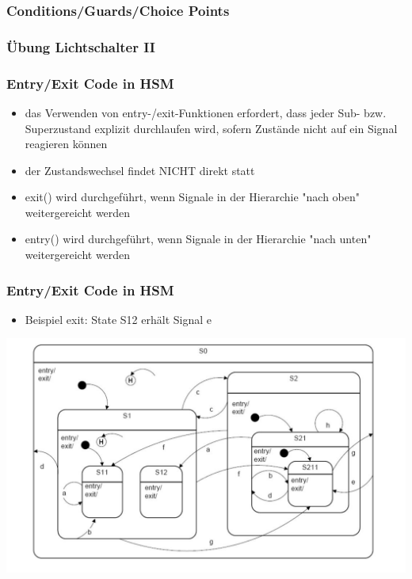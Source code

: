 \documentclass{beamer}
\begin{document}
\begin{frame}
 \frametitle{Conditions/Guards/Choice Points}
\end{frame}

\begin{frame}
 \frametitle{\"Ubung Lichtschalter II}
\end{frame}

\begin{frame}
	\frametitle{Entry/Exit Code in HSM }
	\begin{itemize}
		\item das Verwenden von entry-/exit-Funktionen erfordert, dass jeder Sub- bzw. Superzustand explizit durchlaufen wird, sofern Zust\"ande nicht auf ein Signal reagieren k\"onnen
		\item der Zustandswechsel findet NICHT direkt statt
		\item exit() wird durchgef\"uhrt, wenn Signale in der Hierarchie "nach oben" weitergereicht werden 
		\item entry() wird  durchgef\"uhrt, wenn Signale in der Hierarchie "nach unten" weitergereicht werden
	\end{itemize}
\end{frame}

\begin{frame}
	\frametitle{Entry/Exit Code in HSM }
	\begin{itemize}
		\item Beispiel exit: State S12 erh\"alt Signal e
	\end{itemize}
	\includegraphics[scale=.3]{img/beispiel_automat}
\end{frame}
\end{document}
